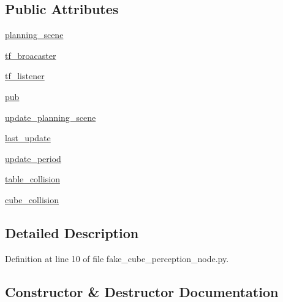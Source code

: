 \subsection*{Public Attributes}
\begin{DoxyCompactItemize}
\item 
\hyperlink{classfake__cube__perception__node_1_1FakePerceptionNode_a9385fd4c339eeaf1ca269ef9e314bb09}{planning\+\_\+scene}
\item 
\hyperlink{classfake__cube__perception__node_1_1FakePerceptionNode_a6f4046762e6ee49202366e4df6a2a60c}{tf\+\_\+broacaster}
\item 
\hyperlink{classfake__cube__perception__node_1_1FakePerceptionNode_a8e6364816c392f5118ad16c794adc142}{tf\+\_\+listener}
\item 
\hyperlink{classfake__cube__perception__node_1_1FakePerceptionNode_a6e2d7e3ce4c1808f5bf033293a2d511d}{pub}
\item 
\hyperlink{classfake__cube__perception__node_1_1FakePerceptionNode_a67b87c9f077aefedf69f3e6d9b29ea94}{update\+\_\+planning\+\_\+scene}
\item 
\hyperlink{classfake__cube__perception__node_1_1FakePerceptionNode_a2f5f0b4e0a1483187b2a84552df7edc1}{last\+\_\+update}
\item 
\hyperlink{classfake__cube__perception__node_1_1FakePerceptionNode_a3df1532cfe1c0b4ed99346a498150c73}{update\+\_\+period}
\item 
\hyperlink{classfake__cube__perception__node_1_1FakePerceptionNode_a47eafffe4962f50c353a0a2adb9e71be}{table\+\_\+collision}
\item 
\hyperlink{classfake__cube__perception__node_1_1FakePerceptionNode_a5af28c647aa93cf6bb90d4228e27667f}{cube\+\_\+collision}
\end{DoxyCompactItemize}


\subsection{Detailed Description}


Definition at line 10 of file fake\+\_\+cube\+\_\+perception\+\_\+node.\+py.



\subsection{Constructor \& Destructor Documentation}
\mbox{\label{classfake__cube__perception__node_1_1FakePerceptionNode_a6f5d90816c2222cf76bd632b5ad46457}} 
